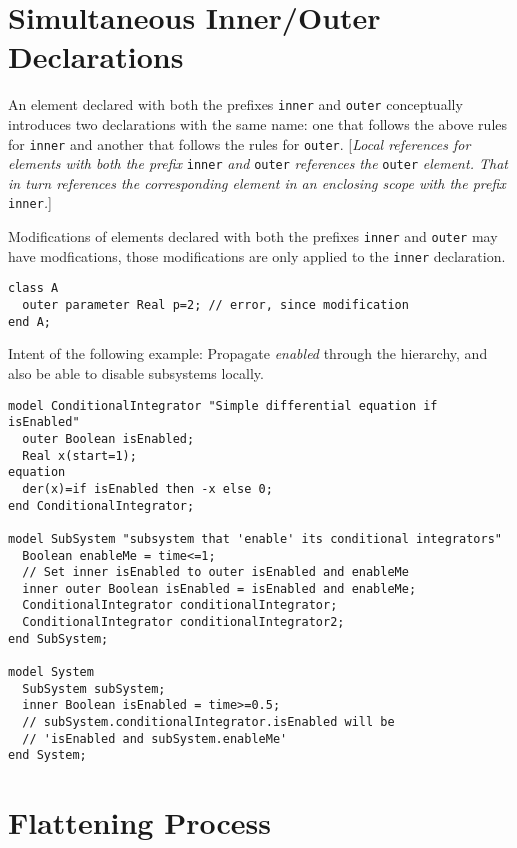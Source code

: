\section{Simultaneous Inner/Outer Declarations}

An element declared with both the prefixes \lstinline!inner! and \lstinline!outer! conceptually
introduces two declarations with the same name: one that follows the
above rules for \lstinline!inner! and another that follows the rules for \lstinline!outer!.
{[}\emph{Local references for elements with both the prefix} \lstinline!inner!
\emph{and} \lstinline!outer! \emph{references the} \lstinline!outer! \emph{element. That in turn
references the corresponding element in an enclosing scope with the
prefix} \lstinline!inner!\emph{.}{]}

Modifications of elements declared with both the prefixes \lstinline!inner! and \lstinline!outer!
may have modfications, those modifications are only applied to the
\lstinline!inner! declaration.

\begin{example}
\begin{lstlisting}[language=modelica]
class A
  outer parameter Real p=2; // error, since modification
end A;
\end{lstlisting}

Intent of the following example: Propagate \emph{enabled} through
the hierarchy, and also be able to disable subsystems locally.
\begin{lstlisting}[language=modelica]
model ConditionalIntegrator "Simple differential equation if isEnabled"
  outer Boolean isEnabled;
  Real x(start=1);
equation
  der(x)=if isEnabled then -x else 0;
end ConditionalIntegrator;

model SubSystem "subsystem that 'enable' its conditional integrators"
  Boolean enableMe = time<=1;
  // Set inner isEnabled to outer isEnabled and enableMe
  inner outer Boolean isEnabled = isEnabled and enableMe;
  ConditionalIntegrator conditionalIntegrator;
  ConditionalIntegrator conditionalIntegrator2;
end SubSystem;

model System
  SubSystem subSystem;
  inner Boolean isEnabled = time>=0.5;
  // subSystem.conditionalIntegrator.isEnabled will be
  // 'isEnabled and subSystem.enableMe'
end System;
\end{lstlisting}
\end{example}

\section{Flattening Process}

